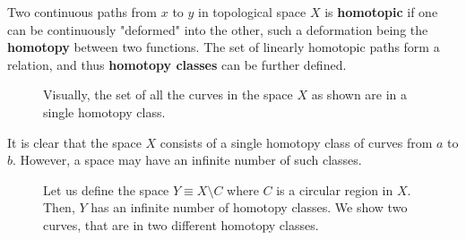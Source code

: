   \begin{definition}[Homotopy]
    Two continuous paths from $x$ to $y$ in topological space $X$ is \textbf{homotopic} if one can be continuously "deformed" into the other, such a deformation being the \textbf{homotopy} between two functions. The set of linearly homotopic paths form a relation, and thus \textbf{homotopy classes} can be further defined. 
    \begin{figure}[H]
      \centering 
      \caption{Visually, the set of all the curves in the space $X$ as shown are in a single homotopy class.} 
      \label{fig:single_homotopy_class}
    \end{figure}
  \end{definition}

  It is clear that the space $X$ consists of a single homotopy class of curves from $a$ to $b$. However, a space may have an infinite number of such classes. 

  \begin{figure}[H]
    \centering 
    \caption{Let us define the space $Y \equiv X \setminus C$ where $C$ is a circular region in $X$. Then, $Y$ has an infinite number of homotopy classes. We show two curves, that are in two different homotopy classes. }
    \label{fig:homotopy_class}
  \end{figure}

